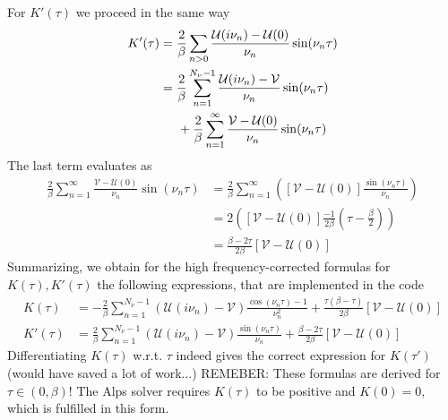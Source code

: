 \documentclass[12pt,a4paper]{scrartcl}
\numberwithin{equation}{section}
\begin{document}
For $K'(\tau)$ we proceed in the same way
\begin{align}
K'(\tau) &= \frac{2}{\beta} \sum_{n>0} \frac{\mathcal{U}(i\nu_n)-\mathcal{U}(0)}{\nu_n}
                                         \sin(\nu_n\tau) \\
%                                        
&= \frac{2}{\beta} \sum_{n=1}^{N_{\nu}-1} \frac{\mathcal{U}(i\nu_n)-\mathcal{V}}{\nu_n}
                                        \sin(\nu_n\tau) \nonumber \\
    &\hspace{0.5cm}+\frac{2}{\beta} \sum_{n=1}^{\infty} \frac{\mathcal{V} -\mathcal{U}(0)}{\nu_n}
                                        \sin(\nu_n\tau) 
\end{align}
The last term evaluates as
\begin{align}
 \frac{2}{\beta} \sum_{n=1}^{\infty} \frac{\mathcal{V} -\mathcal{U}(0)}{\nu_n}
                                        \sin(\nu_n\tau) 
%
& =\frac{2}{\beta} \sum_{n=1}^{\infty}\left( [\mathcal{V} -\mathcal{U}(0)]\frac{\sin(\nu_n\tau)}{\nu_n}
                                          \right) \\
%
& = 2\left( 
            [\mathcal{V} -\mathcal{U}(0)] \frac{-1}{2\beta} \left( \tau -\frac{\beta}{2} \right)             
   \right) \\ 
%
& = \frac{\beta -2\tau}{2\beta}\left[ 
            \mathcal{V} -\mathcal{U}(0)
   \right]
%
\end{align}
Summarizing, we obtain for  the high frequency-corrected formulas for $K(\tau),K'(\tau)$
the following expressions, that are implemented in the code
\begin{align}
K(\tau) 
%
&= -\frac{2}{\beta} \sum_{n=1}^{N_{\nu}-1} \left(\mathcal{U}(i\nu_n)-\mathcal{V} \right)
                                        \frac{ \cos(\nu_n\tau)-1 }{\nu_n^2}
 + \frac{\tau(\beta-\tau)}{2\beta}
          \left[ \mathcal{V}-\mathcal{U}(0)
           \right]\\
%
%
 K'(\tau) 
%                                        
&= \frac{2}{\beta} \sum_{n=1}^{N_{\nu}-1} \left(\mathcal{U}(i\nu_n)-\mathcal{V} \right)
                                        \frac{\sin(\nu_n\tau)}{\nu_n} 
 +\frac{\beta -2\tau}{2\beta}\left[
            \mathcal{V} -\mathcal{U}(0)
             \right]
\end{align}
Differentiating $K(\tau)$ w.r.t. $\tau$ indeed gives the correct expression for $K(\tau')$ (would have saved a lot of work...) REMEBER: These formulas are derived for $\tau\in(0,\beta)$!
The Alps solver requires  $K(\tau)$ to be positive and $K(0)=0$, which is fulfilled in this form.
\end{document}
